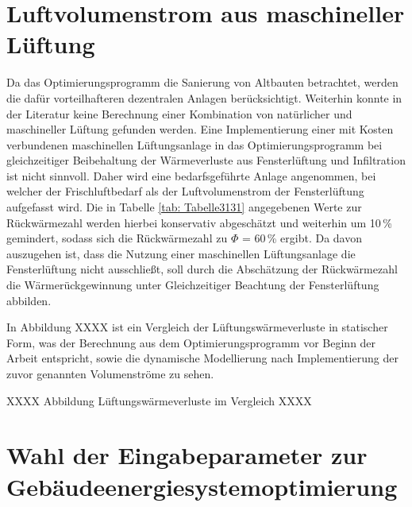 \section*{Luftvolumenstrom aus maschineller Lüftung}

Da das Optimierungsprogramm die Sanierung von Altbauten betrachtet, werden die dafür vorteilhafteren dezentralen Anlagen berücksichtigt.
Weiterhin konnte in der Literatur keine Berechnung einer Kombination von natürlicher und maschineller Lüftung gefunden werden.
Eine Implementierung einer mit Kosten verbundenen maschinellen Lüftungsanlage in das Optimierungsprogramm bei gleichzeitiger Beibehaltung der Wärmeverluste aus Fensterlüftung und Infiltration ist nicht sinnvoll.
Daher wird eine bedarfsgeführte Anlage angenommen, bei welcher der Frischluftbedarf als der Luftvolumenstrom der Fensterlüftung aufgefasst wird.
Die in Tabelle \ref{tab: Tabelle3131} angegebenen Werte zur Rückwärmezahl werden hierbei konservativ abgeschätzt und weiterhin um 10\,\% gemindert, sodass sich die Rückwärmezahl zu \(\Phi\) = 60\,\%  ergibt.
Da davon auszugehen ist, dass die Nutzung einer maschinellen Lüftungsanlage die Fensterlüftung nicht ausschließt, soll durch die Abschätzung der Rückwärmezahl die Wärmerückgewinnung unter Gleichzeitiger Beachtung der Fensterlüftung abbilden.

In Abbildung XXXX ist ein Vergleich der Lüftungswärmeverluste in statischer Form, was der Berechnung aus dem Optimierungsprogramm vor Beginn der Arbeit entspricht, sowie die dynamische Modellierung nach Implementierung der zuvor genannten Volumenströme zu sehen.

XXXX Abbildung Lüftungswärmeverluste im Vergleich XXXX

\section{Wahl der Eingabeparameter zur Gebäudeenergiesystemoptimierung}
\label{sec:Sektion52}

